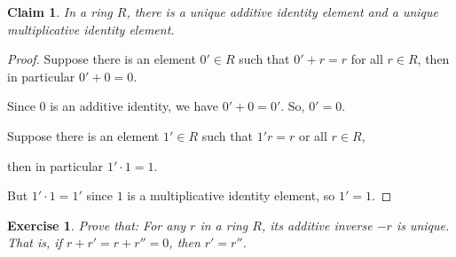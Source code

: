 \documentclass[a4paper,12pt]{report}
\newcounter{statement}
\numberwithin{statement}{chapter}
\newtheorem{claim}[statement]{Claim}
\newtheorem{ex}[statement]{\bf Exercise}
\numberwithin{equation}{chapter}
\numberwithin{section}{chapter}
\numberwithin{subsection}{section}
\begin{document}
\begin{claim}
In a ring $R$, there is a unique additive identity element
and a unique multiplicative identity element.
\end{claim}
\begin{proof}

Suppose there is an element $0' \in R$ such that $0' + r = r$ for all $r \in R$, then
in particular $0' + 0 = 0$.




Since $0$ is an additive identity, we have $0' + 0 = 0'$.
So, $0' = 0$.




Suppose there is an element $1' \in R$ such that $1'r = r$ or all $r \in R$,




then in particular $1' \cdot 1 = 1$.




But $1' \cdot 1 = 1'$ since $1$ is a multiplicative identity element, so $1' = 1$.


\end{proof}



\begin{ex}

Prove that:
For any $r$ in a ring $R$, its additive inverse $-r$ is unique.
That is, if $r + r' = r + r'' = 0$, then $r' = r''$.

\end{ex}
\end{document}
